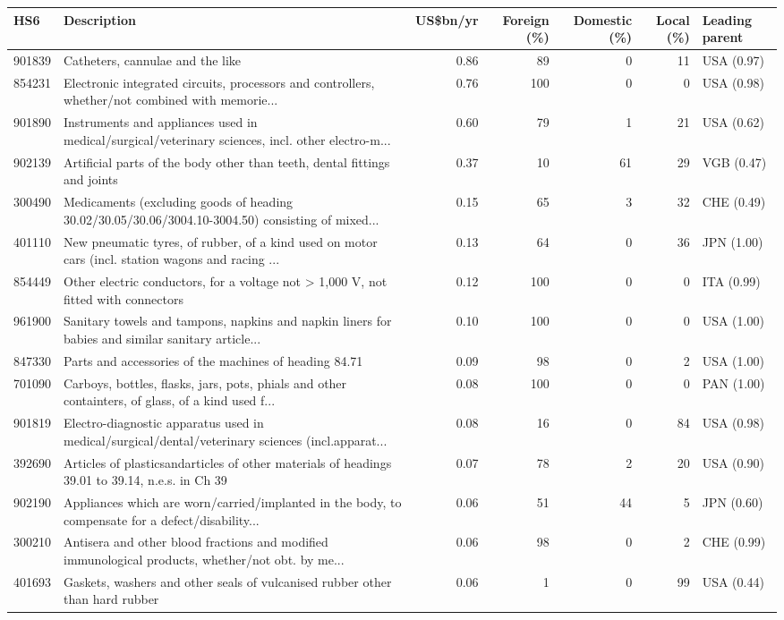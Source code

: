 \begin{tabular}{@{}l p{6.4cm} r r r r l@{}}
\toprule
HS6 & Description & US\$bn/yr & Foreign (\%) & Domestic (\%) & Local (\%) & Leading parent \\
\midrule
901839 & Catheters, cannulae and the like & 0.86 & 89 & 0 & 11 & USA (0.97) \\
854231 & Electronic integrated  circuits, processors and controllers, whether/\allowbreak{}not combined with memorie... & 0.76 & 100 & 0 & 0 & USA (0.98) \\
901890 & Instruments and appliances used in medical/\allowbreak{}surgical/\allowbreak{}veterinary sciences, incl. other electro-m... & 0.60 & 79 & 1 & 21 & USA (0.62) \\
902139 & Artificial parts of the body other than teeth, dental fittings and joints & 0.37 & 10 & 61 & 29 & VGB (0.47) \\
300490 & Medicaments (excluding goods of heading 30.02/\allowbreak{}30.05/\allowbreak{}30.06/\allowbreak{}3004.10-3004.50) consisting of mixed... & 0.15 & 65 & 3 & 32 & CHE (0.49) \\
401110 & New pneumatic tyres, of rubber, of a kind used on motor cars (incl. station wagons and racing ... & 0.13 & 64 & 0 & 36 & JPN (1.00) \\
854449 & Other electric conductors, for a voltage not > 1,000 V, not fitted with connectors & 0.12 & 100 & 0 & 0 & ITA (0.99) \\
961900 & Sanitary towels and tampons, napkins and napkin liners for babies and similar sanitary article... & 0.10 & 100 & 0 & 0 & USA (1.00) \\
847330 & Parts and accessories of the machines of heading 84.71 & 0.09 & 98 & 0 & 2 & USA (1.00) \\
701090 & Carboys, bottles, flasks, jars, pots, phials and other containters, of glass, of a kind used f... & 0.08 & 100 & 0 & 0 & PAN (1.00) \\
901819 & Electro-diagnostic apparatus used in medical/\allowbreak{}surgical/\allowbreak{}dental/\allowbreak{}veterinary sciences (incl.apparat... & 0.08 & 16 & 0 & 84 & USA (0.98) \\
392690 & Articles of plasticsandarticles of other materials of headings 39.01 to 39.14, n.e.s. in Ch 39 & 0.07 & 78 & 2 & 20 & USA (0.90) \\
902190 & Appliances which are worn/\allowbreak{}carried/\allowbreak{}implanted in the body, to compensate for a defect/\allowbreak{}disability... & 0.06 & 51 & 44 & 5 & JPN (0.60) \\
300210 & Antisera and other blood fractions and modified immunological products, whether/\allowbreak{}not obt. by me... & 0.06 & 98 & 0 & 2 & CHE (0.99) \\
401693 & Gaskets, washers and other seals of vulcanised rubber other than hard rubber & 0.06 & 1 & 0 & 99 & USA (0.44) \\
\bottomrule
\end{tabular}
